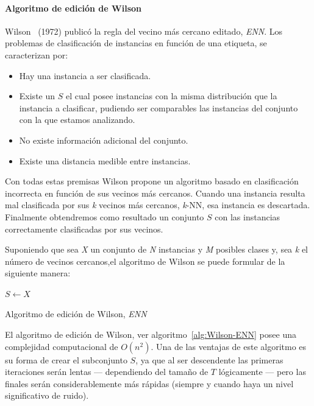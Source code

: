 \paragraph{Algoritmo de edición de Wilson}\label{paragraph:ENN}
\hfill \break
Wilson~\cite{wilson1972asymptotic} (1972) publicó la regla del vecino más cercano editado, \textit{ENN}. Los problemas de clasificación de instancias en función de una etiqueta, se caracterizan por:
\begin{itemize}
\item Hay una instancia a ser clasificada.
\item Existe un $S$ el cual posee instancias con la misma distribución que la instancia a clasificar, pudiendo ser comparables las instancias del conjunto con la que estamos analizando.
\item No existe información adicional del conjunto.
\item Existe una distancia medible entre instancias.
\end{itemize}

Con todas estas premisas Wilson propone un algoritmo basado en clasificación incorrecta en función de sus vecinos más cercanos. Cuando una instancia resulta mal clasificada por sus \textit{k} vecinos más cercanos, \textit{k}-NN, esa instancia es descartada. Finalmente obtendremos como resultado un conjunto $S$ con las instancias correctamente clasificadas por sus vecinos.

Suponiendo que sea \textit{X} un conjunto de \textit{N} instancias y \textit{M} posibles clases y, sea \textit{k} el número de vecinos cercanos,el algoritmo de Wilson se puede formular de la siguiente manera:

\begin{algorithm}[H]
  	\BlankLine
  	$S \leftarrow X$\\
  \caption{Algoritmo de edición de Wilson, \textit{ENN}}\label{alg:Wilson-ENN}
\end{algorithm}

El algoritmo de edición de Wilson, ver algoritmo~\ref{alg:Wilson-ENN} posee una complejidad computacional de $O(n^2)$. Una de las ventajas de este algoritmo es su forma de crear el subconjunto $S$, ya que al ser descendente las primeras iteraciones serán lentas --- dependiendo del tamaño de $T$ lógicamente --- pero las finales serán considerablemente más rápidas (siempre y cuando haya un nivel significativo de ruido).


